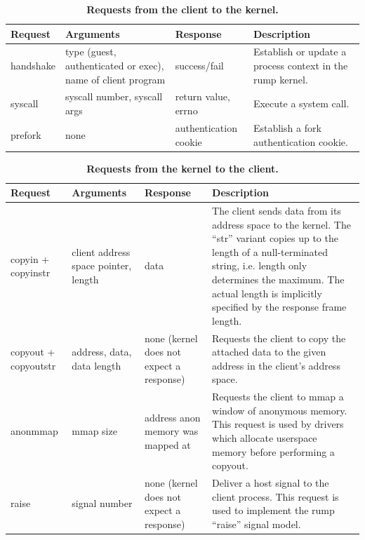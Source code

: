 \begin{table}
{\small
\begin{tabular}{| p{2cm} | p{2.75cm} | p{2.75cm} | p{5.65cm} |}
\hline
Request & Arguments & Response & Description \\
\hline
\hline
handshake &
type (guest, authenticated or exec), name of client program &
success/fail &
Establish or update a process context in the rump kernel. \\
\hline

syscall &
syscall number, syscall args &
return value, errno &
Execute a system call. \\
\hline

prefork &
none &
authentication cookie &
Establish a fork authentication cookie. \\
\hline
\end{tabular}
}
\caption[Requests from the client to the kernel]{
\textbf{Requests from the client to the kernel.}}
\label{tab:remote_clireq}
\end{table}

\begin{table}
{\small
\begin{tabular}{| p{2cm} | p{2.75cm} | p{2.75cm} | p{5.6cm} |}
\hline
Request & Arguments & Response & Description \\
\hline
\hline
copyin + copyinstr &
client address space pointer, length &
data &
The client sends data from its address space
to the kernel.  The ``str'' variant copies up to
the length of a null-terminated string, i.e. length
only determines the maximum.  The actual
length is implicitly specified by the response
frame length. \\
\hline

copyout + copyoutstr &
address, data, data length &
none (kernel does not expect a response) &
Requests the client to copy the attached data
to the given address in the client's address space. \\
\hline

anonmmap &
mmap size &
address anon memory was mapped at &
Requests the client to mmap a window of anonymous memory.  This request is
used by drivers which allocate userspace memory before
performing a copyout. \\

\hline
raise &
signal number &
none (kernel does not expect a response) &
Deliver a host signal to the client process.
This request is used to implement the rump ``raise''
signal model. \\
\hline

\end{tabular}
}
\caption[Requests from the kernel to the client]{
\textbf{Requests from the kernel to the client.}}
\label{tab:remote_kernreq}
\end{table}

